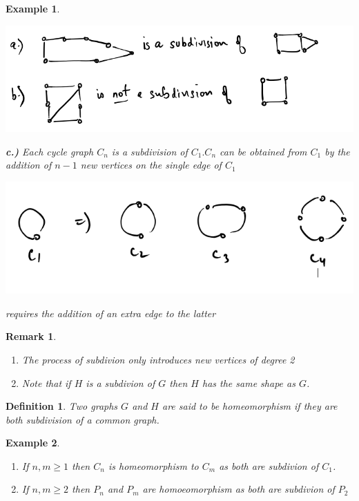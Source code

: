 \documentclass[12pt]{article}
\newtheorem{example}{Example}
\newtheorem{definition}{Definition}
\newtheorem*{remark}{Remark}
\begin{document}
\begin{example}

	\begin{center}
		\includegraphics[scale=0.5]{example6}
	\end{center}
	\textbf{c.)} Each cycle graph $C_{n}$ is a subdivision of $C_{1}. C_{n}$ can be obtained from $C_{1}$ by the addition of $n-1$ new vertices on the single edge of $C_{1}$
	\begin{center}
		\includegraphics[scale=0.5]{c1graph}
	\end{center}

	requires the addition of an extra edge to the latter

\end{example}


\begin{remark}\
	\begin{enumerate}
		\item The process of subdivion only introduces new vertices of degree 2
		\item Note that if $H$ is a subdivion of $G$ then $H$ has the same shape as $G$.
	\end{enumerate}
\end{remark}

\begin{definition}
	Two graphs $G$ and $H$ are said to be homeomorphism if they are both subdivision of a common graph.
\end{definition}

\begin{example}\
	\begin{enumerate}
		\item If $n,m \ge 1$ then $C_{n}$ is homeomorphism to $C_{m}$ as both are subdivion of $C_{1}$.
		\item If $n,m\ge 2$ then $P_{n}$ and $P_{m}$ are homoeomorphism as both are subdivion of $P_{2}$
	\end{enumerate}
\end{example}
\end{document}
